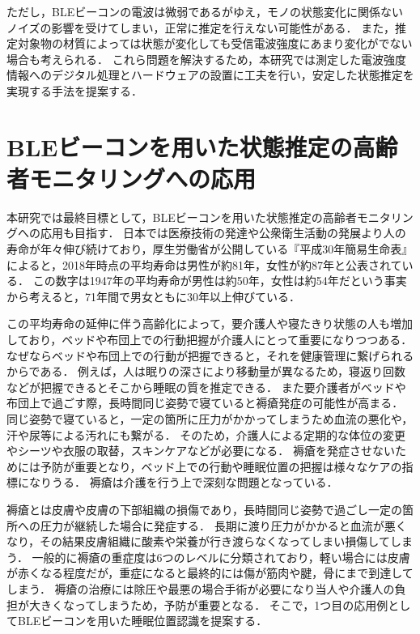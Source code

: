 ただし，BLEビーコンの電波は微弱であるがゆえ，モノの状態変化に関係ないノイズの影響を受けてしまい，正常に推定を行えない可能性がある．
また，推定対象物の材質によっては状態が変化しても受信電波強度にあまり変化がでない場合も考えられる．
これら問題を解決するため，本研究では測定した電波強度情報へのデジタル処理とハードウェアの設置に工夫を行い，安定した状態推定を実現する手法を提案する．


\section{BLEビーコンを用いた状態推定の高齢者モニタリングへの応用}
\label{sec:example}

本研究では最終目標として，BLEビーコンを用いた状態推定の高齢者モニタリングへの応用も目指す．
日本では医療技術の発達や公衆衛生活動の発展より人の寿命が年々伸び続けており，厚生労働省が公開している『平成30年簡易生命表』\cite{AveLife}によると，2018年時点の平均寿命は男性が約81年，女性が約87年と公表されている．
この数字は1947年の平均寿命が男性は約50年，女性は約54年だという事実から考えると，71年間で男女ともに30年以上伸びている．


この平均寿命の延伸に伴う高齢化によって，要介護人や寝たきり状態の人も増加しており，ベッドや布団上での行動把握が介護人にとって重要になりつつある．
なぜならベッドや布団上での行動が把握できると，それを健康管理に繋げられるからである．
例えば，人は眠りの深さにより移動量が異なるため，寝返り回数などが把握できるとそこから睡眠の質を推定できる．
また要介護者がベッドや布団上で過ごす際，長時間同じ姿勢で寝ていると褥瘡発症の可能性が高まる．
同じ姿勢で寝ていると，一定の箇所に圧力がかかってしまうため血流の悪化や，汗や尿等による汚れにも繋がる．
そのため，介護人による定期的な体位の変更やシーツや衣服の取替，スキンケアなどが必要になる\cite{jokusou, mekanizumu}．
褥瘡を発症させないためには予防が重要となり，ベッド上での行動や睡眠位置の把握は様々なケアの指標になりうる．
褥瘡は介護を行う上で深刻な問題となっている．

褥瘡とは皮膚や皮膚の下部組織の損傷であり，長時間同じ姿勢で過ごし一定の箇所への圧力が継続した場合に発症する．
長期に渡り圧力がかかると血流が悪くなり，その結果皮膚組織に酸素や栄養が行き渡らなくなってしまい損傷してしまう．
一般的に褥瘡の重症度は6つのレベルに分類\cite{level}されており，軽い場合には皮膚が赤くなる程度だが，重症になると最終的には傷が筋肉や腱，骨にまで到達してしまう．
褥瘡の治療には除圧や最悪の場合手術が必要になり当人や介護人の負担が大きくなってしまうため，予防が重要となる．
そこで，1つ目の応用例としてBLEビーコンを用いた睡眠位置認識を提案する．

